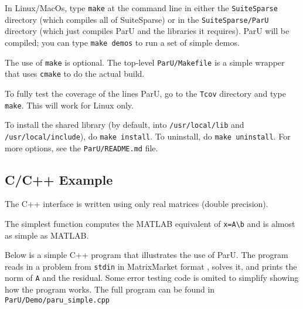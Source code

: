 \documentclass[12pt]{article}
\begin{document}
In Linux/MacOs, type \verb'make' at the command line in either the
\verb'SuiteSparse' directory (which compiles all of SuiteSparse) or in the
\verb'SuiteSparse/ParU' directory (which just compiles ParU and the libraries
it requires).  ParU will be compiled; you can type \verb'make demos' to run a
set of simple demos.

The use of \verb'make' is optional.  The top-level \verb'ParU/Makefile' is
a simple wrapper that uses \verb'cmake' to do the actual build.

To fully test the coverage of the lines ParU, go to the \verb'Tcov'
directory and type \verb'make'.  This will work for Linux only.

To install the shared library (by default, into \verb'/usr/local/lib' and
\verb'/usr/local/include'), do {\tt make install}.  To uninstall, do
{\tt make uninstall}.  For more options, see the {\tt ParU/README.md} file.

\subsection{C/C++ Example}

The C++ interface is written using only real matrices (double precision).

The simplest function computes the MATLAB equivalent of
\verb'x=A\b' and is almost as simple as MATLAB.

Below is a simple C++ program that illustrates the use of ParU.  The program
reads in a problem from \verb'stdin' in MatrixMarket format
\cite{BoisvertPozoRemingtonBarrettDongarra97}, solves it, and prints the norm
of \verb'A' and the residual.  Some error testing code is omited to simplify
showing how the program works.  The full program can be found in
\verb'ParU/Demo/paru_simple.cpp'
\end{document}
